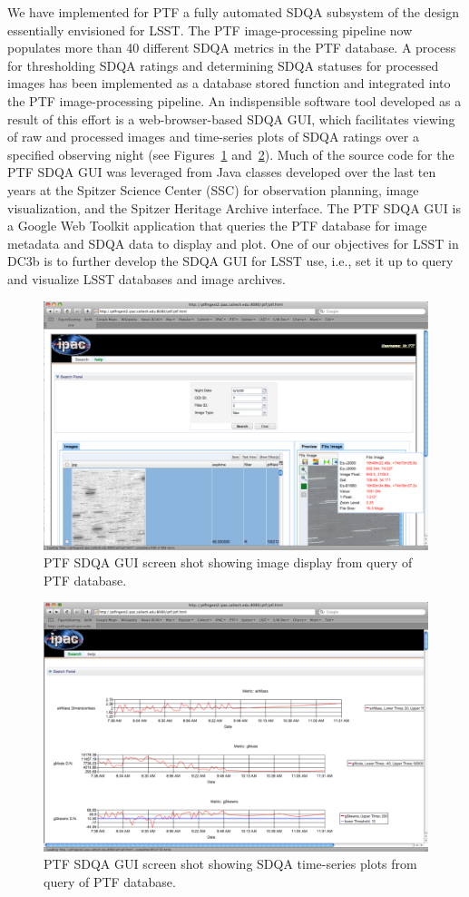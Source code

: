 We have
implemented for PTF a fully automated SDQA subsystem of the design essentially
envisioned for LSST.  The PTF image-processing pipeline now populates more than 40 different
SDQA metrics in the PTF database.  A process for thresholding SDQA ratings and determining 
SDQA statuses for processed images has been implemented as a database stored function and
integrated into the PTF image-processing pipeline.  An indispensible software tool developed 
as a result of this effort is a web-browser-based SDQA GUI, which facilitates viewing of raw and
processed images and time-series plots of SDQA ratings over a specified observing night 
(see Figures~\ref{PTFSDQAGUI1} and~\ref{PTFSDQAGUI2}).  Much of the source 
code for the PTF SDQA GUI was leveraged from Java classes developed over the last ten years at 
the Spitzer Science Center (SSC) for observation planning, image visualization, and the
Spitzer Heritage Archive interface.  The PTF SDQA GUI is a Google Web Toolkit application that
queries the PTF database for image metadata and SDQA data to display and plot.  One of our
objectives for LSST in DC3b is to further develop the SDQA GUI for LSST use, i.e., set it up to 
query and visualize LSST databases and image archives.

\begin{figure}
\includegraphics[width=\textwidth,scale=0.5,bb=0 0 1357 878,clip]{images/PTFSDQSGUI1}
\caption{PTF SDQA GUI screen shot showing image display from query of PTF database.} 
 \label{PTFSDQAGUI1}
\end{figure}

\begin{figure}
\includegraphics[width=\textwidth,bb=0 0 1356 877,clip]{images/PTFSDQSGUI2}
\caption{PTF SDQA GUI screen shot showing SDQA time-series plots from query of PTF database.} 
 \label{PTFSDQAGUI2}
\end{figure}
